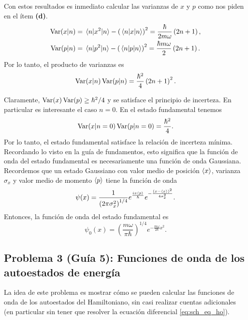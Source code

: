 \documentclass[10pt, a4paper]{article}
\newcommand{\xprefactsq}{\frac{\hbar}{2m\omega}}
\newcommand{\pprefactsq}{\frac{\hbar m \omega}{2}}
\numberwithin{equation}{subsection}
\begin{document}
\bigbreak

Con estos resultados es inmediato calcular las varianzas de $x$ y $p$ como nos
piden en el ítem \textbf{(d)}.
\begin{align}
  \Var(x|n) &= \expval{x^2}{n} - \left(\expval{x}{n}\right)^2 =
    \xprefactsq\left(2n + 1\right), \\
  \Var(p|n) &= \expval{p^2}{n} - \left(\expval{p}{n}\right)^2 =
    \pprefactsq\left(2n + 1\right).
\end{align}
Por lo tanto, el producto de varianzas es
\begin{equation}
  \Var(x|n)\Var(p|n) = \frac{\hbar^2}{4}\left(2n + 1\right)^2.
\end{equation}

Claramente, $\Var(x)\Var(p) \geq \hbar^2/4$ y se satisface el principio de
incerteza. En particular es interesante el caso $n = 0$. En el estado
fundamental tenemos
\begin{equation}
  \Var(x|n = 0)\Var(p|n = 0) = \frac{\hbar^2}{4}.
\end{equation}
Por lo tanto, el estado fundamental satisface la relación de incerteza mínima.
Recordando lo visto en la guía de fundamentos, esto significa que la función de
onda del estado fundamental es necesariamente una función de onda Gaussiana.
Recordemos que un estado Gaussiano con valor medio de posición $\expval{x}$,
varianza $\sigma_x$ y valor medio de momento $\expval{p}$ tiene la función de
onda
\begin{equation} \label{eq:gaussian_wavepacket}
  \psi(x) = \frac{1}{\left(2\pi\sigma_x^2\right)^{1/4}}
    e^{\frac{ix\expval{p}}{\hbar}}
    e^{ -\frac{\left(x - \expval{x}\right)^2}{4\sigma_x^2}}.
\end{equation}
Entonces, la función de onda del estado fundamental es
\begin{equation} \label{eq:psi_n0}
  \psi_{0}(x) = \left(\frac{m\omega}{\pi\hbar}\right)^{1/4}
    e^{ -\frac{m\omega}{2\hbar}x^2}.
\end{equation}

\subsection{Problema 3 (Guía 5):
  Funciones de onda de los autoestados de energía}

La idea de este problema es mostrar cómo se pueden calcular las funciones de
onda de los autoestados del Hamiltoniano, sin casi realizar cuentas
adicionales (en particular sin tener que resolver la ecuación diferencial
\eqref{eq:sch_eq_ho}).
\end{document}
